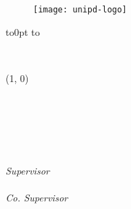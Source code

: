 \begin{titlepage}
  \begin{center}

    \begin{figure}[htbp]
      \centering
      \texttt{[image: unipd-logo]}
    \end{figure}

    \vbox to0pt{
      \vbox to
      \vss}

    \begin{huge}
      \textbf{\myUni}\\
    \end{huge}

    \line(1, 0){\textwidth} \\
    
    \begin{Large}
      \textsc{\myDepartment}\\
    \end{Large}
    
    \vspace{10pt}
    
    \begin{large}
      \textsc{\myFaculty}\\
    \end{large}

    \vspace{30pt}

    \begin{LARGE}
      {\color{unipdred}\textbf{\myTitle}}\\
    \end{LARGE}

    \vfill

    \begin{large}
      \begin{flushleft}
        \textit{Supervisor}\\
        \vspace{5pt}
        \profTitle\ \myProf\\
        \vspace{20pt}
        \textit{Co. Supervisor}\\
        \vspace{5pt}
        \profTitle\ \myCoProf\\
      \end{flushleft}

      \vspace{-55pt}


\end{large}
\end{center}
\end{titlepage}
